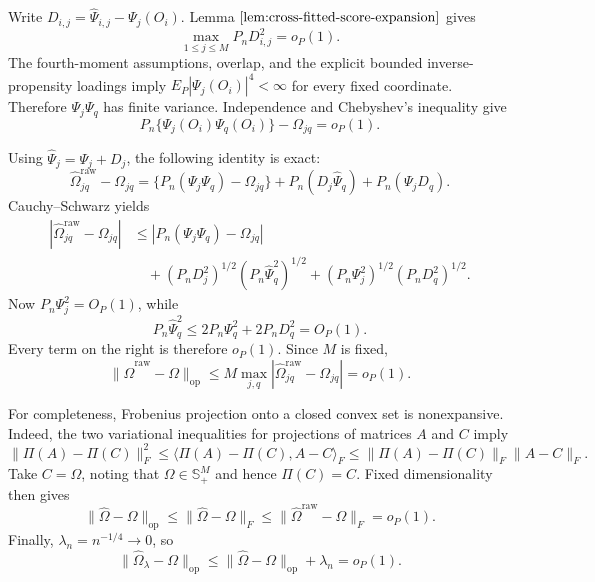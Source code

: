 Write \(D_{i,j}=\widehat\Psi_{i,j}-\Psi_j(O_i)\).  Lemma \(\ref{lem:cross-fitted-score-expansion}\) gives
\[
 \max_{1\le j\le M}P_nD_{i,j}^2=o_P(1).
\]
The fourth-moment assumptions, overlap, and the explicit bounded inverse-propensity loadings imply \(E_P|\Psi_j(O_i)|^4<\infty\) for every fixed coordinate.  Therefore \(\Psi_j\Psi_q\) has finite variance.  Independence and Chebyshev's inequality give
\[
 P_n\{\Psi_j(O_i)\Psi_q(O_i)\}-\Omega_{jq}=o_P(1).
\]

Using \(\widehat\Psi_j=\Psi_j+D_j\), the following identity is exact:
\[
 \widehat\Omega^{\mathrm{raw}}_{jq}-\Omega_{jq}
 =\{P_n(\Psi_j\Psi_q)-\Omega_{jq}\}
  +P_n(D_j\widehat\Psi_q)+P_n(\Psi_jD_q).
\]
Cauchy--Schwarz yields
\[
\begin{aligned}
 |\widehat\Omega^{\mathrm{raw}}_{jq}-\Omega_{jq}|
 &\le |P_n(\Psi_j\Psi_q)-\Omega_{jq}|\\
 &\quad +(P_nD_j^2)^{1/2}(P_n\widehat\Psi_q^2)^{1/2}
 +(P_n\Psi_j^2)^{1/2}(P_nD_q^2)^{1/2}.
\end{aligned}
\]
Now \(P_n\Psi_j^2=O_P(1)\), while
\[
 P_n\widehat\Psi_q^2
 \le2P_n\Psi_q^2+2P_nD_q^2=O_P(1).
\]
Every term on the right is therefore \(o_P(1)\).  Since \(M\) is fixed,
\[
 \|\widehat\Omega^{\mathrm{raw}}-\Omega\|_{\mathrm{op}}
 \le M\max_{j,q}|\widehat\Omega^{\mathrm{raw}}_{jq}-\Omega_{jq}|
 =o_P(1).
\]

For completeness, Frobenius projection onto a closed convex set is nonexpansive.  Indeed, the two variational inequalities for projections of matrices \(A\) and \(C\) imply
\[
 \|\Pi(A)-\Pi(C)\|_F^2
 \le \langle \Pi(A)-\Pi(C),A-C\rangle_F
 \le \|\Pi(A)-\Pi(C)\|_F\|A-C\|_F.
\]
Take \(C=\Omega\), noting that \(\Omega\in\mathbb S_+^M\) and hence \(\Pi(C)=C\).  Fixed dimensionality then gives
\[
 \|\widehat\Omega-\Omega\|_{\mathrm{op}}
 \le \|\widehat\Omega-\Omega\|_F
 \le \|\widehat\Omega^{\mathrm{raw}}-\Omega\|_F=o_P(1).
\]
Finally, \(\lambda_n=n^{-1/4}\to0\), so
\[
 \|\widehat\Omega_\lambda-\Omega\|_{\mathrm{op}}
 \le \|\widehat\Omega-\Omega\|_{\mathrm{op}}+\lambda_n=o_P(1).
\]